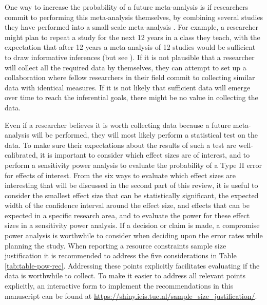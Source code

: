 \documentclass[
]{krantz}
\begin{document}
One way to increase the probability of a future meta-analysis is if researchers commit to performing this meta-analysis themselves, by combining several studies they have performed into a small-scale meta-analysis \citep{cumming_new_2014}. For example, a researcher might plan to repeat a study for the next 12 years in a class they teach, with the expectation that after 12 years a meta-analysis of 12 studies would be sufficient to draw informative inferences (but see \citet{ter_schure_accumulation_2019}). If it is not plausible that a researcher will collect all the required data by themselves, they can attempt to set up a collaboration where fellow researchers in their field commit to collecting similar data with identical measures. If it is not likely that sufficient data will emerge over time to reach the inferential goals, there might be no value in collecting the data.

Even if a researcher believes it is worth collecting data because a future meta-analysis will be performed, they will most likely perform a statistical test on the data. To make sure their expectations about the results of such a test are well-calibrated, it is important to consider which effect sizes are of interest, and to perform a sensitivity power analysis to evaluate the probability of a Type II error for effects of interest. From the six ways to evaluate which effect sizes are interesting that will be discussed in the second part of this review, it is useful to consider the smallest effect size that can be statistically significant, the expected width of the confidence interval around the effect size, and effects that can be expected in a specific research area, and to evaluate the power for these effect sizes in a sensitivity power analysis. If a decision or claim is made, a compromise power analysis is worthwhile to consider when deciding upon the error rates while planning the study. When reporting a resource constraints sample size justification it is recommended to address the five considerations in Table \ref{tab:table-pow-rec}. Addressing these points explicitly facilitates evaluating if the data is worthwhile to collect. To make it easier to address all relevant points explicitly, an interactive form to implement the recommendations in this manuscript can be found at \url{https://shiny.ieis.tue.nl/sample_size_justification/}.
\end{document}

